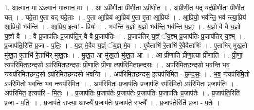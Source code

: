 \documentclass[17pt]{extarticle}
\begin{document}
1. आ॒त्मान॒ मा ऽऽत्मान॑ मा॒त्मान॒ मा । . आ ऽप्री॑णीता प्रीणी॒ता ऽप्री॑णीत । . अ॒प्री॒णी॒त॒ यद् यद॑प्रीणीता प्रीणीत॒ यत् । . यदे॒ता ए॒ता यद् यदे॒ताः । . ए॒ता आ॒प्रिय॑ आ॒प्रिय॑ ए॒ता ए॒ता आ॒प्रियः॑ । . आ॒प्रियो॒ भव॑न्ति॒ भव॑ न्त्या॒प्रिय॑ आ॒प्रियो॒ भव॑न्ति । . आ॒प्रिय॒ इत्या᳚ - प्रियः॑ । . भव॑न्ति य॒ज्ञो य॒ज्ञो भव॑न्ति॒ भव॑न्ति य॒ज्ञ्ः । . य॒ज्ञो वै वै य॒ज्ञो य॒ज्ञो वै । . वै प्र॒जाप॑तिः प्र॒जाप॑ति॒र् वै वै प्र॒जाप॑तिः । . प्र॒जाप॑तिर् य॒ज्ञ्ं ॅय॒ज्ञ्म् प्र॒जाप॑तिः प्र॒जाप॑तिर् य॒ज्ञ्म् । . प्र॒जाप॑ति॒रिति॑ प्र॒जा - प॒तिः॒ । . य॒ज्ञ् मे॒वैव य॒ज्ञ्ं ॅय॒ज्ञ् मे॒व । . ए॒वैताभि॑ रे॒ताभि॑ रे॒वैवैताभिः॑ । . ए॒ताभि॑र् मुख॒तो मु॑ख॒त ए॒ताभि॑ रे॒ताभि॑र् मुख॒तः । . मु॒ख॒त आ मु॑ख॒तो मु॑ख॒त आ । . आ प्री॑णाति प्रीणा॒त्या प्री॑णाति । . प्री॒णा॒ त्यप॑रिमितछन्द॒सो ऽप॑रिमितछन्दसः प्रीणाति प्रीणा॒ त्यप॑रिमितछन्दसः । . अप॑रिमितछन्दसो भवन्ति भव॒ न्त्यप॑रिमितछन्द॒सो ऽप॑रिमितछन्दसो भवन्ति । . अप॑रिमितछन्दस॒ इत्यप॑रिमित - छ॒न्द॒सः॒ । . भ॒व॒ न्त्यप॑रिमि॒तो ऽप॑रिमितो भवन्ति भव॒ न्त्यप॑रिमितः । . अप॑रिमितः प्र॒जाप॑तिः प्र॒जाप॑ति॒ रप॑रिमि॒तो ऽप॑रिमितः प्र॒जाप॑तिः । . अप॑रिमित॒ इत्यप॑रि - मि॒तः॒ । . प्र॒जाप॑तिः प्र॒जाप॑तेः प्र॒जाप॑तेः प्र॒जाप॑तिः प्र॒जाप॑तिः प्र॒जाप॑तेः । . प्र॒जाप॑ति॒रिति॑ प्र॒जा - प॒तिः॒ । . प्र॒जाप॑ते॒ राप्त्या॒ आप्त्यै᳚ प्र॒जाप॑तेः प्र॒जाप॑ते॒ राप्त्यै᳚ । . प्र॒जाप॑ते॒रिति॑ प्र॒जा - प॒तेः॒ । \newline
\end{document}
